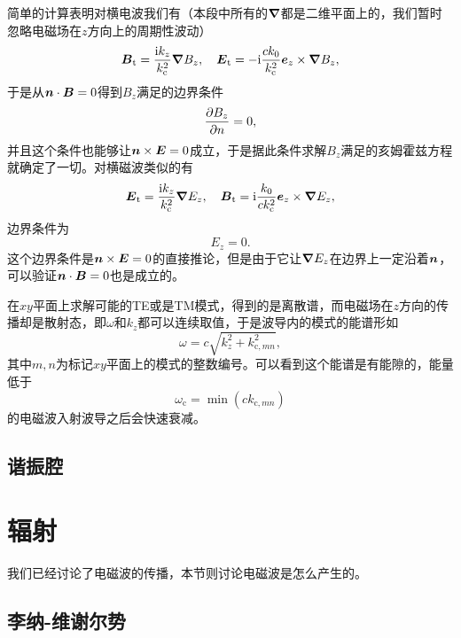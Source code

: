 \documentclass[UTF8, a4paper]{ctexart}
\newcommand*{\ii}{\mathrm{i}}
\begin{document}
简单的计算表明对横电波我们有（本段中所有的$\grad$都是二维平面上的，我们暂时忽略电磁场在$z$方向上的周期性波动）
\begin{equation}
    \vb*{B}_\text{t} = \frac{\ii k_z}{k_\text{c}^2} \grad{B_z}, \quad \vb*{E}_\text{t} = - \ii \frac{c k_0}{k_\text{c}^2} \vb*{e}_z \times \grad{B_z},
\end{equation}
于是从$\vb*{n} \cdot \vb*{B} = 0$得到$B_z$满足的边界条件
\begin{equation}
    \pdv{B_z}{n} = 0,
\end{equation}
并且这个条件也能够让$\vb*{n} \times \vb*{E} = 0$成立，于是据此条件求解$B_z$满足的亥姆霍兹方程就确定了一切。对横磁波类似的有
\begin{equation}
    \vb*{E}_\text{t} = \frac{\ii k_z}{k_\text{c}^2} \grad{E_z}, \quad \vb*{B}_\text{t} = \ii \frac{k_0}{ck_\text{c}^2} \vb*{e}_z \times \grad{E_z},
\end{equation}
边界条件为
\begin{equation}
    E_z = 0.
\end{equation}
这个边界条件是$\vb*{n} \times \vb*{E}=0$的直接推论，但是由于它让$\grad{E_z}$在边界上一定沿着$\vb*{n}$，可以验证$\vb*{n} \cdot \vb*{B}=0$也是成立的。

在$xy$平面上求解可能的TE或是TM模式，得到的是离散谱，而电磁场在$z$方向的传播却是散射态，即$\omega$和$k_z$都可以连续取值，于是波导内的模式的能谱形如
\begin{equation}
    \omega = c \sqrt{k_z^2 + k_{\text{c}, mn}^2},
\end{equation}
其中$m, n$为标记$xy$平面上的模式的整数编号。可以看到这个能谱是有能隙的，能量低于
\begin{equation}
    \omega_\text{c} = \min (c k_{\text{c}, mn})
\end{equation}
的电磁波入射波导之后会快速衰减。

\subsection{谐振腔}



\section{辐射}

我们已经讨论了电磁波的传播，本节则讨论电磁波是怎么产生的。

\subsection{李纳-维谢尔势}
\end{document}
